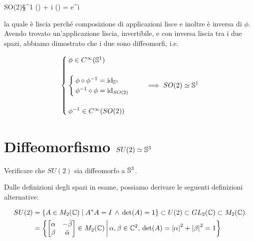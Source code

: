 	{SO(2)}{\S^{1}}
	{\bmqty{ \cos(\theta) & \sin(\theta) \\ -\sin(\theta) & \cos(\theta) }}
	{\cos(\theta) + i \sin(\theta) = e^{i \theta}}

la quale è liscia perché composizione di applicazioni lisce e inoltre è inversa di $ \phi $. Avendo trovato un'applicazione liscia, invertibile, e con inversa liscia tra i due spazi, abbiamo dimostrato che i due sono diffeomorfi, i.e.

\begin{equation}
	\begin{cases}
		\phi \in C^{\infty}(\S^{1}) \\\\
		\begin{cases}
			\phi \circ \phi^{-1} = \id_{\S^{1}} \\
			\phi^{-1} \circ \phi = \id_{SO(2)}
		\end{cases} \\\\
		\phi^{-1} \in C^{\infty}(SO(2))
	\end{cases}
	\implies %
	SO(2) \simeq \S^{1}
\end{equation}

%

\newpage

%

\section{Diffeomorfismo $ SU(2) \simeq \S^{3} $}\label{BONUS3-2}

\begin{tcolorbox}
	Verificare che $ SU(2) $ sia diffeomorfo a $ \S^{3} $.
\end{tcolorbox}

Dalle definizioni degli spazi in esame, possiamo derivare le seguenti definizioni alternative:

\begin{align}
	\begin{split}
		SU(2) &= \{ A \in M_{2}(\C) \mid A^{*} A = I \, \wedge \, \det(A) = 1 \} \subset U(2) \subset GL_{2}(\C) \subset M_{2}(\C) \\
		&= \left\{ \bmqty{ \alpha & - \bar{\beta} \\ \beta & \bar{\alpha} } \in M_{2}(\C) \st \alpha, \beta \in \C^{2}, \, \det(A) = \abs{\alpha}^{2} + \abs{\beta}^{2} = 1 \right\}
	\end{split}
\end{align}

